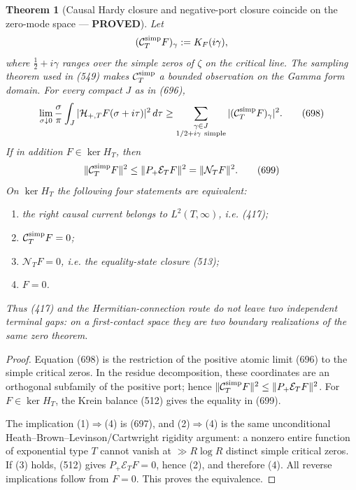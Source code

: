 \documentclass[11pt]{article}
\newtheorem{theorem}{Theorem}
\newcommand{\PROVED}{\textcolor{green!45!black}{\textbf{PROVED}}}
\begin{document}
\begin{theorem}[Causal Hardy closure and negative-port closure coincide on
the zero-mode space --- \PROVED]
Let
\[
 (\mathcal C_T^{\rm simp}F)_\gamma:=K_F(i\gamma),
\]
where \(\frac12+i\gamma\) ranges over the simple zeros of \(\zeta\) on the
critical line.  The sampling theorem used in (549) makes
\(\mathcal C_T^{\rm simp}\) a bounded observation on the Gamma form domain.
For every compact \(J\) as in (696),
\begin{equation}
 \lim_{\sigma\downarrow0}\frac{\sigma}{\pi}
 \int_J|\mathcal H_{+,T}F(\sigma+i\tau)|^2\,d\tau
 \ge
 \sum_{\substack{\gamma\in J\\
       1/2+i\gamma\ {\rm simple}}}
 |(\mathcal C_T^{\rm simp}F)_\gamma|^2 .            \tag{698}
\end{equation}
If in addition \(F\in\ker H_T\), then
\begin{equation}
 \|\mathcal C_T^{\rm simp}F\|^2
 \le \|P_+\mathcal E_TF\|^2
 =\|\mathcal N_TF\|^2.                              \tag{699}
\end{equation}
On \(\ker H_T\) the following four statements are equivalent:
\begin{enumerate}
\item the right causal current belongs to \(L^2(T,\infty)\), i.e. (417);
\item \(\mathcal C_T^{\rm simp}F=0\);
\item \(\mathcal N_TF=0\), i.e. the equality-state closure (513);
\item \(F=0\).
\end{enumerate}
Thus (417) and the Hermitian-connection route do not leave two independent
terminal gaps: on a first-contact space they are two boundary realizations
of the same zero theorem.
\end{theorem}

\begin{proof}
Equation (698) is the restriction of the positive atomic limit (696) to
the simple critical zeros.  In the residue decomposition, these coordinates
are an orthogonal subfamily of the positive port; hence
\(\|\mathcal C_T^{\rm simp}F\|^2\le
\|P_+\mathcal E_TF\|^2\).  For \(F\in\ker H_T\), the Krein balance (512)
gives the equality in (699).

The implication (1)\(\Rightarrow\)(4) is (697), and
(2)\(\Rightarrow\)(4) is the same unconditional
Heath--Brown--Levinson/Cartwright rigidity argument: a nonzero entire
function of exponential type \(T\) cannot vanish at
\(\gg R\log R\) distinct simple critical zeros.  If (3) holds, (512)
gives \(P_+\mathcal E_TF=0\), hence (2), and therefore (4).  All reverse
implications follow from \(F=0\).  This proves the equivalence.
\end{proof}
\end{document}
